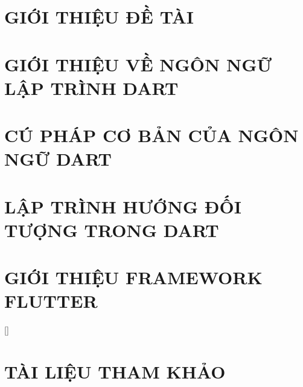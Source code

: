 \documentclass[a4paper,13pt,3p,oneside]{report}
\renewcommand{\headrulewidth}{0pt}
\renewcommand{\footrulewidth}{0pt}}
\theoremstyle{definition}
\begin{document}
\newpage
{}

\pagestyle{fancy}
\fancyhf{}
\fancyhead[LO, RE]{\leftmark}
\renewcommand{\headrulewidth}{0.3pt}
\renewcommand{\footrulewidth}{0.3pt}
\doublespacing

\chapter{GIỚI THIỆU ĐỀ TÀI}
\label{chapter:Introduction}

\newpage
\chapter{GIỚI THIỆU VỀ NGÔN NGỮ LẬP TRÌNH DART}
\label{chapter:Introduction_Dart_Programming}


\newpage
\chapter{CÚ PHÁP CƠ BẢN CỦA NGÔN NGỮ DART}
\label{chapter:Dart_Syntax}


\newpage
\chapter{LẬP TRÌNH HƯỚNG ĐỐI TƯỢNG TRONG DART}
\label{chapter:Experiment}


\newpage
\chapter{GIỚI THIỆU FRAMEWORK FLUTTER}
\label{chapter:SolutionAndContribution}


\cleardoublepage              %
\null                        
\thispagestyle{empty}        
\newpage                    


[]

\chapter*{TÀI LIỆU THAM KHẢO}
{}

\end{document}
